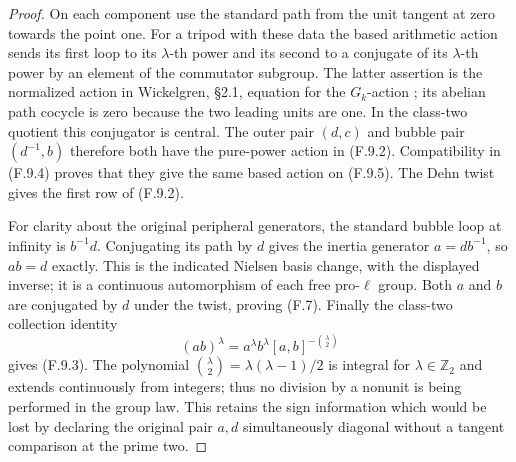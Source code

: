 \begin{proof}
On each component use the standard path from
the unit tangent at zero towards the point
one.  For a tripod with these data the based
arithmetic action sends its first loop to its
$\lambda$-th power and its second to a conjugate
of its $\lambda$-th power by an element of the
commutator subgroup.  The latter assertion
is the normalized action in Wickelgren,
\S2.1, equation for the $G_k$-action
\cite{BC_Wickelgren2012}; its abelian path
cocycle is zero because the two leading
units are one.  In the class-two quotient
this conjugator is central.  The outer pair
$(d,c)$ and bubble pair $(d^{-1},b)$ therefore
both have the pure-power action in (F.9.2).
Compatibility in (F.9.4) proves that they
give the same based action on (F.9.5).
The Dehn twist gives the first row of
(F.9.2).

For clarity about the original peripheral
generators, the standard bubble loop at
infinity is $b^{-1}d$.  Conjugating its path
by $d$ gives the inertia generator
$a=db^{-1}$, so $ab=d$ exactly.  This is
the indicated Nielsen basis change, with
the displayed inverse; it is a continuous
automorphism of each free pro-$\ell$ group.
Both $a$ and $b$ are conjugated by $d$ under
the twist, proving (F.7).
Finally the class-two collection identity
\[
          (ab)^\lambda=a^\lambda b^\lambda
                          [a,b]^{-\binom\lambda2}
\]
gives (F.9.3).  The polynomial
$\binom\lambda2=\lambda(\lambda-1)/2$
is integral for $\lambda\in\mathbb Z_2$
and extends continuously from integers;
thus no division by a nonunit is being
performed in the group law.  This retains
the sign information which would be lost
by declaring the original pair $a,d$
simultaneously diagonal without a tangent
comparison at the prime two.
\end{proof}


